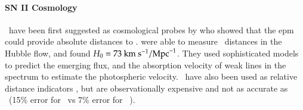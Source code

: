 \paragraph{SN II Cosmology}
\sneiip\ have been first suggested as cosmological probes by \citet{1974ApJ...193...27K} who showed that the \gls{epm} could provide absolute distances to \sneii. \cite{1994ApJ...432...42S} were able to measure \snii\ distances in the Hubble flow, and found $H_0 = 73~\textrm{km}~\textrm{s}^{-1} / \textrm{Mpc}^{-1}$. They used sophisticated models to predict the emerging flux, and the absorption velocity of weak lines in the spectrum to estimate the photospheric velocity.  \sniip\ have also been used as relative distance indicators \citep{2002ApJ...566L..63H}, but are observationally expensive and not as accurate as \snia\ (15\% error for \snii\  vs 7\% error for \snia\ \citep{2006ApJ...645..841N}).

